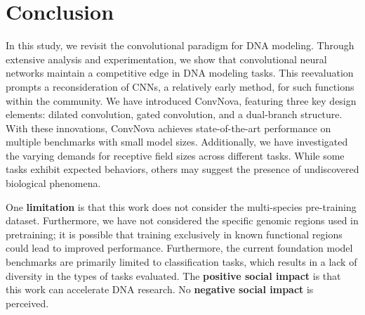 \section{Conclusion}\label{conclusion}
In this study, we revisit the convolutional paradigm for DNA modeling. Through extensive analysis and experimentation, we show that convolutional neural networks maintain a competitive edge in DNA modeling tasks. This reevaluation prompts a reconsideration of CNNs, a relatively early method, for such functions within the community. We
have 
introduced ConvNova, featuring three key design elements: dilated convolution, gated convolution, and a dual-branch structure. With these innovations, ConvNova achieves state-of-the-art performance on multiple benchmarks with small model sizes.
Additionally, we have investigated the varying demands for receptive field sizes across different tasks. While some tasks exhibit expected behaviors, others may suggest the presence of undiscovered biological phenomena.

One \textbf{limitation} is that this work does not consider the multi-species pre-training dataset. Furthermore, we have not considered the specific genomic regions used in pretraining; it is possible that training exclusively in known functional regions could lead to improved performance. Furthermore, the current foundation model benchmarks are primarily limited to classification tasks, which results in a lack of diversity in the types of tasks evaluated. The \textbf{ positive social impact} is that this work can accelerate DNA research. No \textbf{ negative social impact} is perceived.
